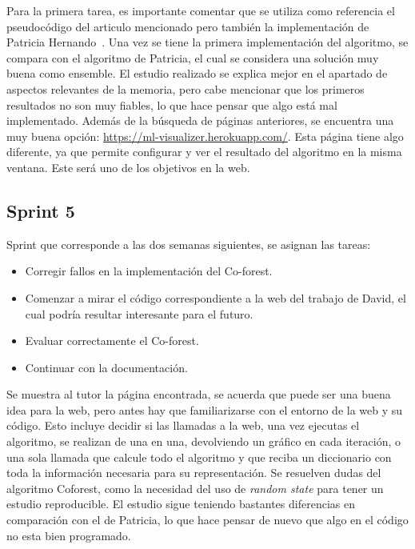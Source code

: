 Para la primera tarea, es importante comentar que se utiliza como referencia el pseudocódigo del articulo mencionado pero también la implementación de Patricia Hernando~\cite{TFG:Patricia}. 
Una vez se tiene la primera implementación del algoritmo, se compara con el algoritmo de Patricia, el cual se considera una solución muy buena como ensemble.
El estudio realizado se explica mejor en el apartado de aspectos relevantes de la memoria, pero cabe mencionar que los primeros resultados no son muy fiables, lo que hace pensar que algo está mal implementado.
Además de la búsqueda de páginas anteriores, se encuentra una muy buena opción: \url{https://ml-visualizer.herokuapp.com/}. Esta página tiene algo diferente, ya que permite configurar y ver el resultado del algoritmo en la misma ventana. Este será uno de los objetivos en la web.

\subsection{Sprint 5}
Sprint que corresponde a las dos semanas siguientes, se asignan las tareas:
\begin{itemize}
	\item Corregir fallos en la implementación del Co-forest.
	\item Comenzar a mirar el código correspondiente a la web del trabajo de David, el cual podría resultar interesante para el futuro.
	\item Evaluar correctamente el Co-forest.
	\item Continuar con la documentación.
\end{itemize}

Se muestra al tutor la página encontrada, se acuerda que puede ser una buena idea para la web, pero antes hay que familiarizarse con el entorno de la web y su código. Esto incluye decidir si las llamadas a la web, una vez ejecutas el algoritmo, se realizan de una en una, devolviendo un gráfico en cada iteración, o una sola llamada que calcule todo el algoritmo y que reciba un diccionario con toda la información necesaria para su representación. Se resuelven dudas del algoritmo Coforest, como la necesidad del uso de \textit{random state} para tener un estudio reproducible. El estudio sigue teniendo bastantes diferencias en comparación con el de Patricia, lo que hace pensar de nuevo que algo en el código no esta bien programado.


